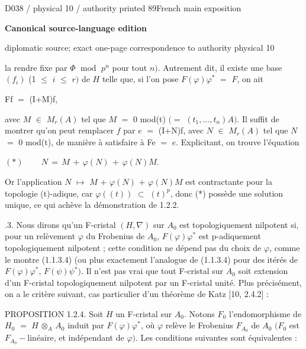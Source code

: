 \documentclass[9pt]{article}
\newcommand{\CanonText}[1]{\par{\fontsize{8.0}{9.35}\selectfont\RaggedRight #1\par}\vspace{2.2pt}}
\newcommand{\CanonDisplay}[1]{\par\vspace{1.2pt}\begin{center}{\fontsize{7.2}{8.4}\selectfont\(\displaystyle #1\)}\end{center}\vspace{1.2pt}}
\newcommand{\LayerTitle}{Canonical source-language edition}
\begin{document}
\noindent\begin{minipage}[t][\dimexpr\textheight-5pt\relax][t]{\textwidth}
{\sffamily\fontsize{7.3}{8.2}\selectfont\color{Quiet} D038 / physical 10 / authority printed 89\hfill French main exposition}
\par{}\vspace{4.5pt}
{\sffamily\fontsize{10.4}{11.6}\selectfont\bfseries\color{Accent} \LayerTitle}
\par{\sffamily\fontsize{6.7}{7.7}\selectfont\color{Quiet} diplomatic source; exact one-page correspondence to authority physical 10}
\vspace{5pt}
\CanonText{la rendre fixe par \(\Phi{}\) \(\operatorname{mod}\) \(p^{n}\) pour tout \(n)\). Autrement dit, il existe une base \((f_{i})\) (1 \(\leq{}\) \(i\) \(\leq{}\) \(r)\) de \(H\) telle que, si l'on pose \(F(\varphi{})\varphi{}^{*}\) \(=\) \(F\), on ait}
\CanonText{Ff \(=\) (I+M)f,}
\CanonText{avec \(M\) \(\in{}\) \(M_{r}(A)\) tel que \(M\) \(=\) 0 mod(t) \((=\) \((t_{1},\ldots{},t_{n})A)\). Il suffit de montrer qu'on peut remplacer \(f\) par \(e\) \(=\) (I+N)f, avec \(N\) \(\in{}\) \(M_{r}(A)\) tel que \(N\) \(=\) 0 mod(t), de manière à satisfaire à Fe \(=\) \(e\). Explicitant, on trouve l'équation}
\CanonDisplay{(*)\qquad\,N\,=\,M\,+\,\varphi{}(N)\,+\,\varphi{}(N)M.}
\CanonText{Or l'application \(N\) \(\mapsto{}\) \(M\) + \(\varphi{}(N)\) + \(\varphi{}(N)M\) est contractante pour la topologie (t)-adique, car \(\varphi{}((t))\) \(\subset{}\) \((t)^{p}\), donc (*) possède une solution unique, ce qui achève la démonstration de 1.2.2.}
\CanonText{1.2.3. Nous dirons qu'un F-cristal \((H,\nabla{})\) sur \(A_{0}\) est topologiquement nilpotent si, pour un relèvement \(\varphi{}\) du Frobenius de \(A_{0}\), \(F(\varphi{})\varphi{}^{*}\) est p-adiquement topologiquement nilpotent ; cette condition ne dépend pas du choix de \(\varphi{}\), comme le montre (1.1.3.4) (ou plus exactement l'analogue de (1.1.3.4) pour des itérés de \(F(\varphi{})\varphi{}^{*}\), \(F(\psi{})\psi{}^{*})\). Il n'est pas vrai que tout F-cristal sur \(A_{0}\) soit extension d'un F-cristal topologiquement nilpotent par un F-cristal unité. Plus précisément, on a le critère suivant, cas particulier d'un théorème de Katz [10, 2.4.2] :}
\CanonText{PROPOSITION 1.2.4. Soit \(H\) un F-cristal sur \(A_{0}\). Notons \(F_{0}\) l'endomorphisme de \(H_{0}\) \(=\) \(H\) \(\otimes{}_{A}\) \(A_{0}\) induit par \(F(\varphi{})\varphi{}^{*}\), où \(\varphi{}\) relève le Frobenius \(F_{A_{0}}\) de \(A_{0}\) \((F_{0}\) est \(F_{A_{0}}-\text{linéaire}\), et indépendant de \(\varphi{})\). Les conditions suivantes sont équivalentes :}

\end{minipage}
\end{document}

